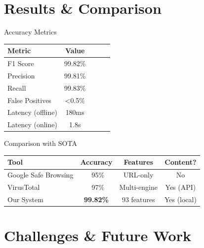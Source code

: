 \documentclass[10pt, aspectratio=169]{beamer}
\begin{document}
\section{Results \& Comparison}

\begin{frame}{Accuracy Metrics}
    \begin{table}
        \centering
        \begin{tabular}{@{}lcccc@{}}
            \toprule
            Metric & Value \\
            \midrule
            F1 Score & 99.82\% \\
            Precision & 99.81\% \\
            Recall & 99.83\% \\
            False Positives & <0.5\% \\
            Latency (offline) & 180ms \\
            Latency (online) & 1.8s \\
            \bottomrule
        \end{tabular}
    \end{table}
\end{frame}

\begin{frame}{Comparison with SOTA}
    \begin{table}
        \centering
        \begin{tabular}{@{}lccc@{}}
            \toprule
            Tool & Accuracy & Features & Content? \\
            \midrule
            Google Safe Browsing & ~95\% & URL-only & No \\
            VirusTotal & ~97\% & Multi-engine & Yes (API) \\
            Our System & \textbf{99.82\%} & 93 features & Yes (local) \\
            \bottomrule
        \end{tabular}
    \end{table}
\end{frame}

\section{Challenges \& Future Work}
\end{document}
